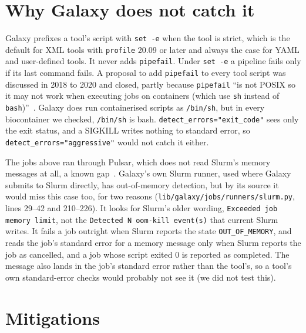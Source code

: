 \documentclass[11pt,letterpaper]{article}
\newcommand{\code}[1]{\texttt{#1}}
\begin{document}
\section{Why Galaxy does not catch it}

Galaxy prefixes a tool's script with \code{set -e} when the tool is strict, which is the default for XML tools with
\code{profile} 20.09 or later and always the case for YAML and user-defined tools. It never adds \code{pipefail}.
Under \code{set -e} a pipeline fails only if its last command fails. A proposal to add \code{pipefail} to every tool
script was discussed in 2018 to 2020 and closed, partly because \code{pipefail} ``is not POSIX so it may not work
when executing jobs on containers (which use \code{sh} instead of \code{bash})''~\cite{galaxy5884}. Galaxy does run
containerised scripts as \code{/bin/sh}, but in every biocontainer we checked, \code{/bin/sh} is bash.
\code{detect\_errors="exit\_code"} sees only the exit status, and a SIGKILL writes nothing to standard error, so
\code{detect\_errors="aggressive"} would not catch it either.

The jobs above ran through Pulsar, which does not read Slurm's memory messages at all, a known gap~\cite{galaxy24545}.
Galaxy's own Slurm runner, used where Galaxy submits to Slurm directly, has out-of-memory detection, but by its
source it would miss this case too, for two reasons
(\code{lib/galaxy/jobs/runners/slurm.py}, lines 29--42 and 210--226). It looks for Slurm's older wording,
\code{Exceeded job memory limit}, not the \code{Detected N oom-kill event(s)} that current Slurm writes. It fails a job
outright when Slurm reports the state \code{OUT\_OF\_MEMORY}, and reads the job's standard error for a memory
message only when Slurm reports the job as cancelled, and a job whose script exited 0 is reported as completed. The message also lands in the job's standard error rather than the tool's, so a tool's own
standard-error checks would probably not see it (we did not test this).

\section{Mitigations}
\end{document}
